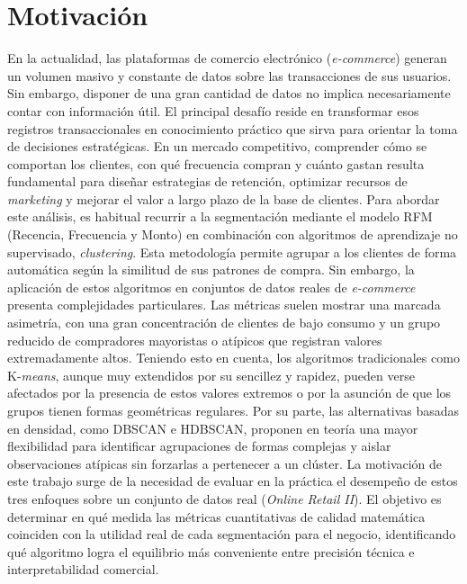 \documentclass[a4paper,10pts,openany]{book}
\begin{document}
	
	
	\section{Motivación}
	
	En la actualidad, las plataformas de comercio electrónico (\emph{e-commerce}) generan un volumen masivo y constante de datos sobre las transacciones de sus usuarios. Sin embargo, disponer de una gran cantidad de datos no implica necesariamente contar con información útil. El principal desafío reside en transformar esos registros transaccionales en conocimiento práctico que sirva para orientar la toma de decisiones estratégicas. En un mercado competitivo, comprender cómo se comportan los clientes, con qué frecuencia compran y cuánto gastan resulta fundamental para diseñar estrategias de retención, optimizar recursos de \emph{marketing} y mejorar el valor a largo plazo de la base de clientes. Para abordar este análisis, es habitual recurrir a la segmentación mediante el modelo RFM (Recencia, Frecuencia y Monto) en combinación con algoritmos de aprendizaje no supervisado, \emph{clustering}. Esta metodología permite agrupar a los clientes de forma automática según la similitud de sus patrones de compra. Sin embargo, la aplicación de estos algoritmos en conjuntos de datos reales de \emph{e-commerce} presenta complejidades particulares. Las métricas suelen mostrar una marcada asimetría, con una gran concentración de clientes de bajo consumo y un grupo reducido de compradores mayoristas o atípicos que registran valores extremadamente altos. Teniendo esto en cuenta, los algoritmos tradicionales como K-\emph{means}, aunque muy extendidos por su sencillez y rapidez, pueden verse afectados por la presencia de estos valores extremos o por la asunción de que los grupos tienen formas geométricas regulares. Por su parte, las alternativas basadas en densidad, como DBSCAN e HDBSCAN, proponen en teoría una mayor flexibilidad para identificar agrupaciones de formas complejas y aislar observaciones atípicas sin forzarlas a pertenecer a un clúster.
	La motivación de este trabajo surge de la necesidad de evaluar en la práctica el desempeño de estos tres enfoques sobre un conjunto de datos real (\emph{Online Retail II}). El objetivo es determinar en qué medida las métricas cuantitativas de calidad matemática coinciden con la utilidad real de cada segmentación para el negocio, identificando qué algoritmo logra el equilibrio más conveniente entre precisión técnica e interpretabilidad comercial.
	
\end{document}
